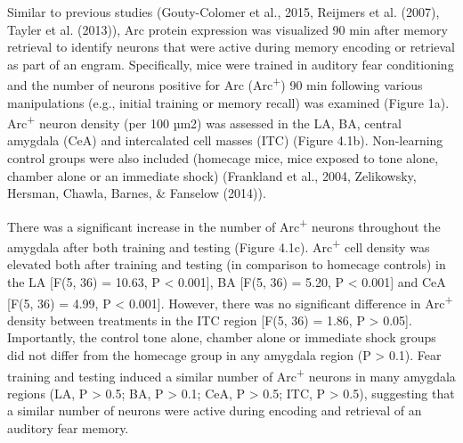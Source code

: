 \documentclass[12pt,a4paperpaper,]{report}
\begin{document}
Similar to previous studies (Gouty-Colomer et al., 2015, Reijmers et al.
(2007), Tayler et al. (2013)), Arc protein expression was visualized 90
min after memory retrieval to identify neurons that were active during
memory encoding or retrieval as part of an engram. Specifically, mice
were trained in auditory fear conditioning and the number of neurons
positive for Arc (Arc\textsuperscript{+}) 90 min following various
manipulations (e.g., initial training or memory recall) was examined
(Figure 1a). Arc\textsuperscript{+} neuron density (per 100 µm2) was
assessed in the LA, BA, central amygdala (CeA) and intercalated cell
masses (ITC) (Figure 4.1b). Non-learning control groups were also
included (homecage mice, mice exposed to tone alone, chamber alone or an
immediate shock) (Frankland et al., 2004, Zelikowsky, Hersman, Chawla,
Barnes, \& Fanselow (2014)).

There was a significant increase in the number of Arc\textsuperscript{+}
neurons throughout the amygdala after both training and testing (Figure
4.1c). Arc\textsuperscript{+} cell density was elevated both after
training and testing (in comparison to homecage controls) in the LA
{[}F(5, 36) = 10.63, P \textless{} 0.001{]}, BA {[}F(5, 36) = 5.20, P
\textless{} 0.001{]} and CeA {[}F(5, 36) = 4.99, P \textless{} 0.001{]}.
However, there was no significant difference in Arc\textsuperscript{+}
density between treatments in the ITC region {[}F(5, 36) = 1.86, P
\textgreater{} 0.05{]}. Importantly, the control tone alone, chamber
alone or immediate shock groups did not differ from the homecage group
in any amygdala region (P \textgreater{} 0.1). Fear training and testing
induced a similar number of Arc\textsuperscript{+} neurons in many
amygdala regions (LA, P \textgreater{} 0.5; BA, P \textgreater{} 0.1;
CeA, P \textgreater{} 0.5; ITC, P \textgreater{} 0.5), suggesting that a
similar number of neurons were active during encoding and retrieval of
an auditory fear memory.
\end{document}
